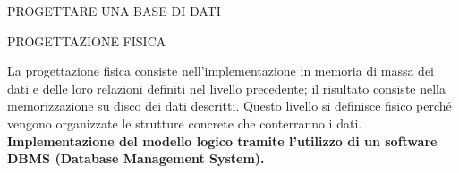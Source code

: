 \documentclass[aspectratio=1610]{beamer}
\begin{document}
\begin{frame}{PROGETTARE UNA BASE DI DATI}
    \begin{alertblock}{PROGETTAZIONE FISICA}
        \begin{minipage}{0.98\linewidth}
            \justifying
            La progettazione fisica consiste nell’implementazione in memoria di massa dei
            dati e delle loro relazioni definiti nel livello precedente; il risultato consiste
            nella memorizzazione su disco dei dati descritti. Questo livello si definisce
            fisico perché vengono organizzate le strutture concrete che conterranno i dati.\\
            \textbf{Implementazione del modello logico tramite l’utilizzo di un software 
            DBMS (Database Management System).}
        \end{minipage}
    \end{alertblock}
\end{frame}
\end{document}
